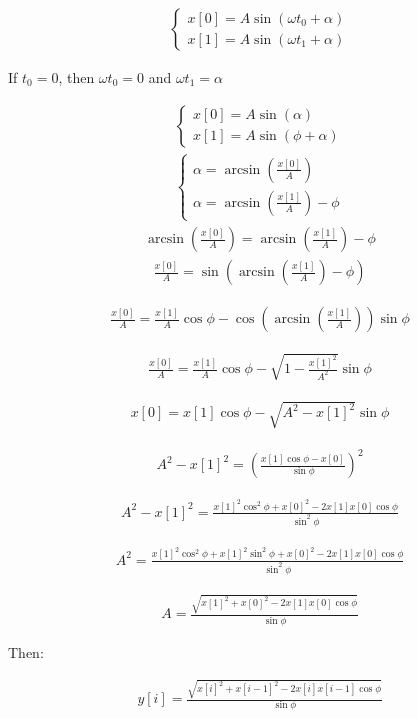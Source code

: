 \documentclass[fleqn]{article}
\begin{document}
\pagestyle{empty}

\begin{align*}
\begin{cases}
x[0]=A\sin(\omega t_{0}+\alpha)\\
x[1]=A\sin(\omega t_{1}+\alpha)
\end{cases}
\end{align*}

If $t_{0}=0$, then $\omega t_{0}=0$ and $\omega t_{1}=\alpha$

\begin{align*}
\begin{cases}
x[0]=A\sin(\alpha)\\
x[1]=A\sin(\phi+\alpha)
\end{cases}
\end{align*}
\begin{align*}
\begin{cases}
\alpha=\arcsin\left(\frac{x[0]}{A}\right)\\
\alpha=\arcsin\left(\frac{x[1]}{A}\right)-\phi
\end{cases}
\end{align*}
\begin{align*}
\arcsin\left(\frac{x[0]}{A}\right)=\arcsin\left(\frac{x[1]}{A}\right)-\phi
\end{align*}
\begin{align*}
\frac{x[0]}{A}=\sin\left(\arcsin\left(\frac{x[1]}{A}\right)-\phi\right)
\end{align*}

\begin{align*}
\frac{x[0]}{A}=\frac{x[1]}{A}\cos\phi-\cos\left(\arcsin\left(\frac{x[1]}{A}\right)\right)\sin\phi
\end{align*}

\begin{align*}
\frac{x[0]}{A}=\frac{x[1]}{A}\cos\phi-\sqrt{1-\frac{x[1]^{2}}{A^{2}}}\sin\phi
\end{align*}

\begin{align*}
x[0]=x[1]\cos\phi-\sqrt{A^{2}-x[1]^{2}}\sin\phi
\end{align*}

\begin{align*}
A^{2}-x[1]^{2}=\left(\frac{x[1]\cos\phi-x[0]}{\sin\phi}\right)^{2}
\end{align*}

\begin{align*}
A^{2}-x[1]^{2}=\frac{x[1]^{2}\cos^{2}\phi+x[0]^{2}-2x[1]x[0]\cos\phi}{\sin^{2}\phi}
\end{align*}

\begin{align*}
A^{2}=\frac{x[1]^{2}\cos^{2}\phi+x[1]^{2}\sin^{2}\phi+x[0]^{2}-2x[1]x[0]\cos\phi}{\sin^{2}\phi}
\end{align*}

\begin{align*}
A=\frac{\sqrt{x[1]^{2}+x[0]^{2}-2x[1]x[0]\cos\phi}}{\sin\phi}
\end{align*}

Then:

\begin{align*}
y[i]=\frac{\sqrt{x[i]^{2}+x[i-1]^{2}-2x[i]x[i-1]\cos\phi}}{\sin\phi}
\end{align*}
\end{document}
